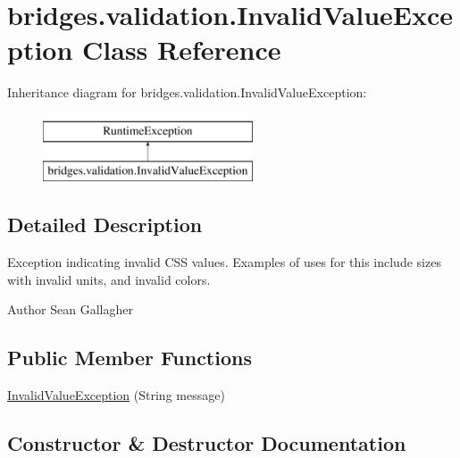 \hypertarget{classbridges_1_1validation_1_1_invalid_value_exception}{}\section{bridges.\+validation.\+Invalid\+Value\+Exception Class Reference}
\label{classbridges_1_1validation_1_1_invalid_value_exception}
Inheritance diagram for bridges.\+validation.\+Invalid\+Value\+Exception\+:\begin{figure}[H]
\begin{center}
\leavevmode
\includegraphics[height=2.000000cm]{classbridges_1_1validation_1_1_invalid_value_exception}
\end{center}
\end{figure}


\subsection{Detailed Description}
Exception indicating invalid C\+SS values. Examples of uses for this include sizes with invalid units, and invalid colors. \begin{DoxyAuthor}{Author}
Sean Gallagher 
\end{DoxyAuthor}
\subsection*{Public Member Functions}
\begin{DoxyCompactItemize}
\item 
\mbox{\hyperlink{classbridges_1_1validation_1_1_invalid_value_exception_adf4c16bcef674454b87d8cc035efc75d}{Invalid\+Value\+Exception}} (String message)
\end{DoxyCompactItemize}


\subsection{Constructor \& Destructor Documentation}
\mbox{\label{classbridges_1_1validation_1_1_invalid_value_exception_adf4c16bcef674454b87d8cc035efc75d}} 
